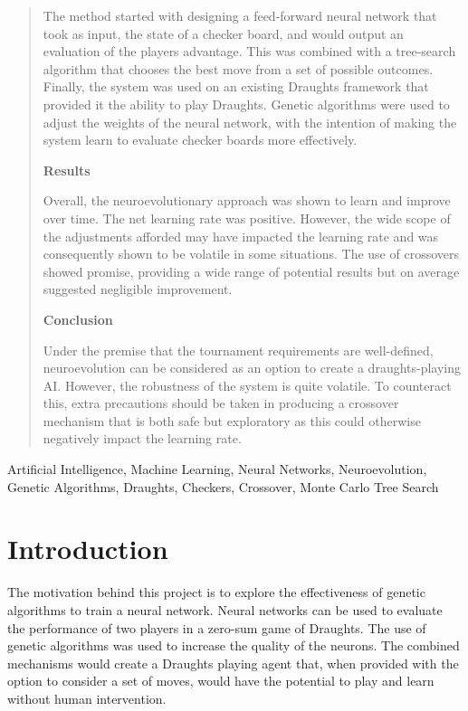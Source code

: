 \documentclass[12pt,a4paper]{article}
\begin{document}
\begin{abstract}
    The method started with designing a feed-forward neural network that took as input, the state of a checker board, and would output an evaluation of the players advantage. This was combined with a tree-search algorithm that chooses the best move from a set of possible outcomes. Finally, the system was used on an existing Draughts framework that provided it the ability to play Draughts. Genetic algorithms were used to adjust the weights of the neural network, with the intention of making the system learn to evaluate checker boards more effectively. 
    
    {\bf Results}

    Overall, the neuroevolutionary approach was shown to learn and improve over time. The net learning rate was positive. However, the wide scope of the adjustments afforded may have impacted the learning rate and was consequently shown to be volatile in some situations. The use of crossovers showed promise, providing a wide range of potential results but on average suggested negligible improvement.

    {\bf Conclusion}

    Under the premise that the tournament requirements are well-defined, neuroevolution can be considered as an option to create a draughts-playing AI. However, the robustness of the system is quite volatile. To counteract this, extra precautions should be taken in producing a crossover mechanism that is both safe but exploratory as this could otherwise negatively impact the learning rate.

\end{abstract}
\begin{keywords}
    Artificial Intelligence, Machine Learning, Neural Networks, Neuroevolution, Genetic Algorithms, Draughts, Checkers, Crossover, Monte Carlo Tree Search
\end{keywords}
\section{Introduction}
    The motivation behind this project is to explore the effectiveness of genetic algorithms to train a neural network. Neural networks can be used to evaluate the performance of two players in a zero-sum game of Draughts. The use of genetic algorithms was used to increase the quality of the neurons. The combined mechanisms would create a Draughts playing agent that, when provided with the option to consider a set of moves, would have the potential to play and learn without human intervention.
\end{document}
